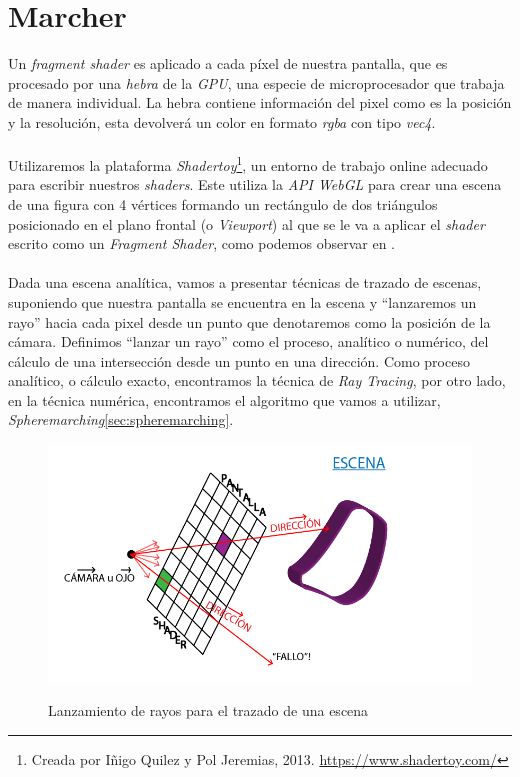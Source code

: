 \chapter{Marcher\label{ch:marcher}}
Un \textit{fragment shader} es aplicado a cada píxel de nuestra pantalla, que es procesado por una \textit{hebra} de la \textit{GPU}, una especie de microprocesador que trabaja de manera individual. La hebra contiene información del pixel como es la posición y la resolución, esta devolverá un color en formato \textit{rgba} con tipo \textit{vec4}.\\\\
Utilizaremos la plataforma \textit{Shadertoy}\footnote{Creada por Iñigo Quilez  y Pol Jeremias, 2013. \url{https://www.shadertoy.com/}}, un entorno de trabajo online adecuado para escribir nuestros \textit{shaders}. Este utiliza la \textit{API WebGL} para crear una escena de una figura con 4 vértices formando un rectángulo de dos triángulos posicionado en el plano frontal (o \textit{Viewport}) al que se le va a aplicar el \textit{shader} escrito como un \textit{Fragment Shader}, como podemos observar en . \\\\
Dada una escena analítica, vamos a presentar técnicas de trazado de escenas, suponiendo que nuestra pantalla se encuentra en la escena y \enquote{lanzaremos un rayo} hacia cada pixel desde un punto que denotaremos como la posición de la cámara. Definimos \enquote{lanzar un rayo} como el proceso, analítico o numérico, del cálculo de una intersección desde un punto en una dirección. Como proceso analítico, o cálculo exacto, encontramos la técnica de 
\textit{Ray Tracing}\cite{glassner1989introduction}, por otro lado, en la técnica numérica, encontramos el algoritmo que vamos a utilizar, \textit{Spheremarching}\ref{sec:spheremarching}.

\begin{figure}[H]
  \centering
  \captionsetup{justification=centering}
  \includegraphics[width=1.0\textwidth]{secciones/imagenes/starting/gpu.png}\label{fig:marcher}
  \caption{Lanzamiento de rayos para el trazado de una escena}
\end{figure}


